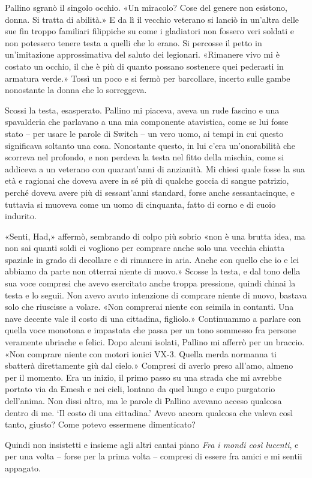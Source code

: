 Pallino sgranò il singolo occhio. «Un miracolo? Cose del genere non
esistono, donna. Si tratta di abilità.» E da lì il vecchio veterano si
lanciò in un'altra delle sue fin troppo familiari filippiche su come i
gladiatori non fossero veri soldati e non potessero tenere testa a
quelli che lo erano. Si percosse il petto in un'imitazione
approssimativa del saluto dei legionari. «Rimanere vivo mi è costato un
occhio, il che è più di quanto possano sostenere quei pederasti in
armatura verde.» Tossì un poco e si fermò per barcollare, incerto sulle
gambe nonostante la donna che lo sorreggeva.

Scossi la testa, esasperato. Pallino mi piaceva, aveva un rude fascino e
una spavalderia che parlavano a una mia componente atavistica, come se
lui fosse stato -- per usare le parole di Switch -- un vero uomo, ai
tempi in cui questo significava soltanto una cosa. Nonostante questo, in
lui c'era un'onorabilità che scorreva nel profondo, e non perdeva la
testa nel fitto della mischia, come si addiceva a un veterano con
quarant'anni di anzianità. Mi chiesi quale fosse la sua età e ragionai
che doveva avere in sé più di qualche goccia di sangue patrizio, perché
doveva avere più di sessant'anni standard, forse anche sessantacinque, e
tuttavia si muoveva come un uomo di cinquanta, fatto di corno e di cuoio
indurito.

«Senti, Had,» affermò, sembrando di colpo più sobrio «non è una brutta
idea, ma non sai quanti soldi ci vogliono per comprare anche solo una
vecchia chiatta spaziale in grado di decollare e di rimanere in aria.
Anche con quello che io e lei abbiamo da parte non otterrai niente di
nuovo.» Scosse la testa, e dal tono della sua voce compresi che avevo
esercitato anche troppa pressione, quindi chinai la testa e lo seguii.
Non avevo avuto intenzione di comprare niente di nuovo, bastava solo che
riuscisse a volare. «Non comprerai niente con seimila in contanti. Una
nave decente vale il costo di una cittadina, figliolo.» Continuammo a
parlare con quella voce monotona e impastata che passa per un tono
sommesso fra persone veramente ubriache e felici. Dopo alcuni isolati,
Pallino mi afferrò per un braccio. «Non comprare niente con motori
ionici VX-3. Quella merda normanna ti sbatterà direttamente giù dal
cielo.» Compresi di averlo preso all'amo, almeno per il momento. Era un
inizio, il primo passo su una strada che mi avrebbe portato via da Emesh
e nei cieli, lontano da quel lungo e cupo purgatorio dell'anima. Non
dissi altro, ma le parole di Pallino avevano acceso qualcosa dentro di
me. `Il costo di una cittadina.' \emph{} Avevo ancora qualcosa che
valeva così tanto, giusto? Come potevo essermene dimenticato?

Quindi non insistetti e insieme agli altri cantai piano \emph{Fra i
	mondi così lucenti}, e per una volta -- forse per la prima volta --
compresi di essere fra amici e mi sentii appagato.


